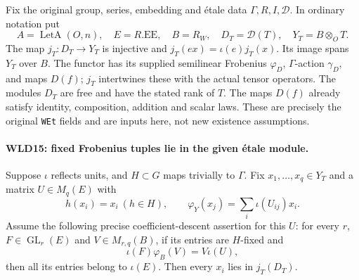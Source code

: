 Fix the original group, series, embedding and \'etale data
$\Gamma,R,I,\mathcal D$. In ordinary notation put
\[
 A=\operatorname{LetA}(O,n),\quad E=R.\mathrm{EE},\quad
 B=R_W,\quad D_T=\mathcal D(T),\quad Y_T=B\otimes_OT.
\]
The map $j_T:D_T\to Y_T$ is injective and
$j_T(ex)=\iota(e)j_T(x)$. Its image spans $Y_T$ over $B$.
The functor has its supplied semilinear Frobenius $\varphi_D$,
$\Gamma$-action $\gamma_D$, and maps $D(f)$; $j_T$ intertwines
these with the actual tensor operators. The modules $D_T$ are
free and have the stated rank of $T$. The maps $D(f)$ already
satisfy identity, composition, addition and scalar laws.
These are precisely the original \texttt{WEt} fields and are
inputs here, not new existence assumptions.

\paragraph{WLD15: fixed Frobenius tuples lie in the given \'etale module.}
\label{claim:WLD15}
Suppose $\iota$ reflects units, and $H\subset G$ maps trivially to
$\Gamma$. Fix $x_1,\ldots,x_q\in Y_T$ and a matrix $U\in M_q(E)$
with
\[
 h(x_i)=x_i\ (h\in H),\qquad
            \varphi_Y(x_j)=\sum_i\iota(U_{ij})x_i.          \tag{WLD.18}
\]
Assume the following precise coefficient-descent assertion for this
$U$: for every $r$, $F\in\operatorname{GL}_r(E)$ and
$V\in M_{r,q}(B)$, if its entries are $H$-fixed and
\[
                    \iota(F)\varphi_B(V)=V\iota(U),        \tag{WLD.19}
\]
then all its entries belong to $\iota(E)$. Then every $x_i$ lies
in $j_T(D_T)$.


